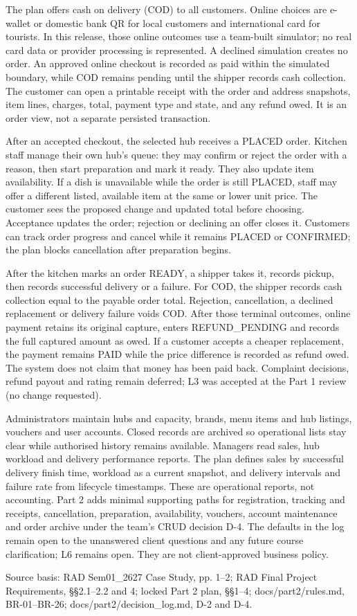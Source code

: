 The plan offers cash on delivery (COD) to all customers. Online choices are e-wallet or domestic bank QR for local customers and international card for tourists. In this release, those online outcomes use a team-built simulator; no real card data or provider processing is represented. A declined simulation creates no order. An approved online checkout is recorded as paid within the simulated boundary, while COD remains pending until the shipper records cash collection. The customer can open a printable receipt with the order and address snapshots, item lines, charges, total, payment type and state, and any refund owed. It is an order view, not a separate persisted transaction.

After an accepted checkout, the selected hub receives a PLACED order. Kitchen staff manage their own hub's queue: they may confirm or reject the order with a reason, then start preparation and mark it ready. They also update item availability. If a dish is unavailable while the order is still PLACED, staff may offer a different listed, available item at the same or lower unit price. The customer sees the proposed change and updated total before choosing. Acceptance updates the order; rejection or declining an offer closes it. Customers can track order progress and cancel while it remains PLACED or CONFIRMED; the plan blocks cancellation after preparation begins.

After the kitchen marks an order READY, a shipper takes it, records pickup, then records successful delivery or a failure. For COD, the shipper records cash collection equal to the payable order total. Rejection, cancellation, a declined replacement or delivery failure voids COD. After those terminal outcomes, online payment retains its original capture, enters REFUND\_PENDING and records the full captured amount as owed. If a customer accepts a cheaper replacement, the payment remains PAID while the price difference is recorded as refund owed. The system does not claim that money has been paid back. Complaint decisions, refund payout and rating remain deferred; L3 was accepted at the Part 1 review (no change requested).

Administrators maintain hubs and capacity, brands, menu items and hub listings, vouchers and user accounts. Closed records are archived so operational lists stay clear while authorised history remains available. Managers read sales, hub workload and delivery performance reports. The plan defines sales by successful delivery finish time, workload as a current snapshot, and delivery intervals and failure rate from lifecycle timestamps. These are operational reports, not accounting. Part 2 adds minimal supporting paths for registration, tracking and receipts, cancellation, preparation, availability, vouchers, account maintenance and order archive under the team's CRUD decision D-4. The defaults in the log remain open to the unanswered client questions and any future course clarification; L6 remains open. They are not client-approved business policy.

Source basis: RAD Sem01\_2627 Case Study, pp. 1--2; RAD Final Project Requirements, \S{}\S{}2.1--2.2 and 4; locked Part 2 plan, \S{}\S{}1--4; docs/part2/rules.md, BR-01--BR-26; docs/part2/decision\_log.md, D-2 and D-4.
